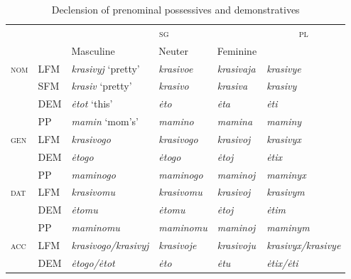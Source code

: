 \documentclass[output=paper,
colorlinks,
citecolor=brown,
newtxmath
]{langscibook}
\begin{document}
\begin{table}\caption{Declension of prenominal possessives and demonstratives\label{tab1:paradigm}}
\small
\begin{tabular}{>{\scshape}llllll} 
  \lsptoprule
    &            &                      \multicolumn{3}{c}{\textsc{sg}}     & \multicolumn{1}{c}{\textsc{pl}}\\\cmidrule(lr){3-5}
    &            &                      Masculine &                     Neuter    &         Feminine        &\\
  \midrule
  nom&     LFM         &       \textit{krasivyj} `pretty'    & \textit{krasivoe}   & \textit{krasivaja}   & \textit{krasivye}\\
  &     SFM         &       \textit{krasiv} `pretty'    & \textit{krasivo}   & \textit{krasiva}   & \textit{krasivy}\\
  &               DEM         &       \textit{ėtot} `this'        & \textit{ėto}       & \textit{ėta}       & \textit{ėti}\\
  &               PP          &       \textit{mamin} `mom's'       & \textit{mamino}    & \textit{mamina}    & \textit{maminy}\\
  \midrule 
  gen&       LFM         &       \textit{krasivogo}          & \textit{krasivogo} & \textit{krasivoj}  & \textit{krasivyx}\\
  &               DEM         &       \textit{ėtogo}              & \textit{ėtogo}     & \textit{ėtoj}      & \textit{ėtix}\\
  &               PP          &       \textit{maminogo}           & \textit{maminogo}  & \textit{maminoj}   & \textit{maminyx}\\
  \midrule
  dat&         LFM         &       \textit{krasivomu}          & \textit{krasivomu} & \textit{krasivoj}  & \textit{krasivym}\\
  &               DEM         &       \textit{ėtomu}              & \textit{ėtomu}     & \textit{ėtoj}      & \textit{ėtim}\\
  &               PP          &       \textit{maminomu}           & \textit{maminomu}  & \textit{maminoj}   & \textit{maminym}\\
  \midrule
  acc&     LFM         &       \textit{krasivogo/krasivyj} & \textit{krasivoje} & \textit{krasivoju} & \textit{krasivyx/krasivye}\\
  &               DEM         &       \textit{ėtogo/ėtot}         & \textit{ėto}       & \textit{ėtu}       & \textit{ėtix/ėti}\\

\end{tabular}
\end{table}
\end{document}
